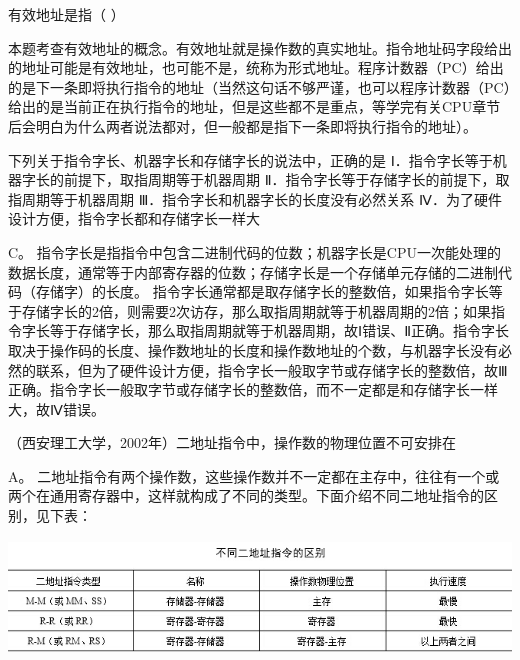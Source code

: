 \question 有效地址是指（ ）
\par{}
\begin{solution}本题考查有效地址的概念。有效地址就是操作数的真实地址。指令地址码字段给出的地址可能是有效地址，也可能不是，统称为形式地址。程序计数器（PC）给出的是下一条即将执行指令的地址（当然这句话不够严谨，也可以程序计数器（PC）给出的是当前正在执行指令的地址，但是这些都不是重点，等学完有关CPU章节后会明白为什么两者说法都对，但一般都是指下一条即将执行指令的地址）。
\end{solution}
\question 下列关于指令字长、机器字长和存储字长的说法中，正确的是
Ⅰ．指令字长等于机器字长的前提下，取指周期等于机器周期
Ⅱ．指令字长等于存储字长的前提下，取指周期等于机器周期
Ⅲ．指令字长和机器字长的长度没有必然关系
Ⅳ．为了硬件设计方便，指令字长都和存储字长一样大
\par{}
\begin{solution}C。
指令字长是指指令中包含二进制代码的位数；机器字长是CPU一次能处理的数据长度，通常等于内部寄存器的位数；存储字长是一个存储单元存储的二进制代码（存储字）的长度。
指令字长通常都是取存储字长的整数倍，如果指令字长等于存储字长的2倍，则需要2次访存，那么取指周期就等于机器周期的2倍；如果指令字长等于存储字长，那么取指周期就等于机器周期，故Ⅰ错误、Ⅱ正确。指令字长取决于操作码的长度、操作数地址的长度和操作数地址的个数，与机器字长没有必然的联系，但为了硬件设计方便，指令字长一般取字节或存储字长的整数倍，故Ⅲ正确。指令字长一般取字节或存储字长的整数倍，而不一定都是和存储字长一样大，故Ⅳ错误。
\end{solution}
\question （西安理工大学，2002年）二地址指令中，操作数的物理位置不可安排在
\par{}
\begin{solution}A。
二地址指令有两个操作数，这些操作数并不一定都在主存中，往往有一个或两个在通用寄存器中，这样就构成了不同的类型。下面介绍不同二地址指令的区别，见下表：
\includegraphics[width=6.85417in,height=1.48958in]{computerassets/4816e952d855fb6bd05b9a469095a3a0.jpeg}
\end{solution}
